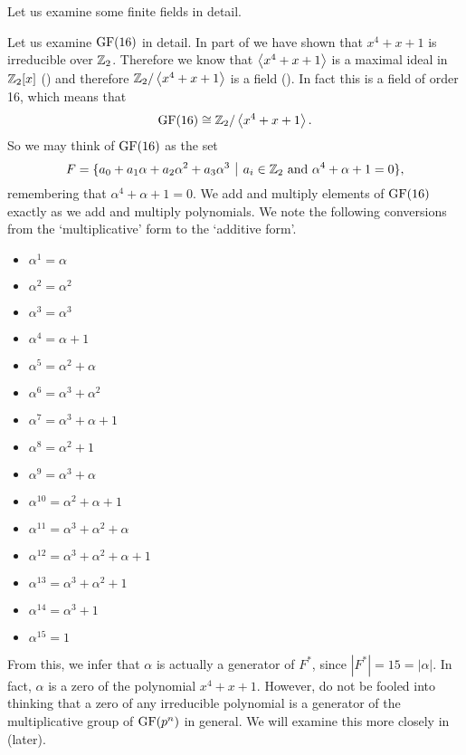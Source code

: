 Let us examine some finite fields in detail.
\begin{example}\label{example-GF16-analysis}
    Let us examine $\mathrm{GF}(16)$ in detail. In part of  we have shown that $x^4 + x + 1$ is irreducible over $\mathbb{Z}_2$. Therefore we know that $\left\langle x^4 + x + 1\right\rangle$ is a maximal ideal in $\mathbb{Z}_2[x]$ () and therefore $\mathbb{Z}_2/\left\langle x^4+x+1\right\rangle$ is a field (). In fact this is a field of order 16, which means that
    \[
        \mathrm{GF}(16) \cong \mathbb{Z}_2/\left\langle x^4+x+1\right\rangle.
    \]
    So we may think of $\mathrm{GF}(16)$ as the set
    \[
        F = \{a_0 + a_1\alpha + a_2\alpha^2 + a_3\alpha^3 \vert a_i \in \Z_2 \text{ and } \alpha^4 + \alpha + 1 = 0\},
    \]
    remembering that $\alpha^4 + \alpha + 1 = 0$. We add and multiply elements of $\mathrm{GF}(16)$ exactly as we add and multiply polynomials. We note the following conversions from the `multiplicative' form to the `additive form'.
    \begin{multicols}{3}
        \begin{itemize}
            \item $\alpha^1 = \alpha$
            \item $\alpha^2 = \alpha^2$
            \item $\alpha^3 = \alpha^3$
            \item $\alpha^4 = \alpha + 1$
            \item $\alpha^5 = \alpha^2 + \alpha$
            \item $\alpha^6 = \alpha^3 + \alpha^2$
            \item $\alpha^7 = \alpha^3 + \alpha + 1$
            \item $\alpha^8 = \alpha^2 + 1$
            \item $\alpha^9 = \alpha^3 + \alpha$
            \item $\alpha^{10} = \alpha^2 + \alpha + 1$
            \item $\alpha^{11} = \alpha^3 + \alpha^2 + \alpha$
            \item $\alpha^{12} = \alpha^3 + \alpha^2 + \alpha + 1$
            \item $\alpha^{13} = \alpha^3 + \alpha^2 + 1$
            \item $\alpha^{14} = \alpha^3 + 1$
            \item $\alpha^{15} = 1$
        \end{itemize}
    \end{multicols}
    From this, we infer that $\alpha$ is actually a generator of $F^\ast$, since $|F^\ast| = 15 = |\alpha|$. In fact, $\alpha$ is a zero of the polynomial $x^4 + x + 1$. However, do not be fooled into thinking that a zero of any irreducible polynomial is a generator of the multiplicative group of $\mathrm{GF}(p^n)$ in general. We will examine this more closely in  (later).


\end{example}
